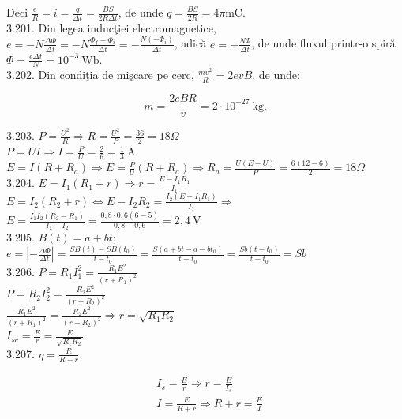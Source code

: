 \documentclass[10pt]{article}
\begin{document}
Deci $\frac{e}{R}=i=\frac{q}{\Delta t}=\frac{B S}{2 R \Delta t}$, de unde $q=\frac{B S}{2 R}=4 \pi \mathrm{mC}$.\\
3.201. Din legea inducţiei electromagnetice,\\
$e=-N \frac{\Delta \Phi}{\Delta t}=-N \frac{\Phi_{f}-\Phi_{i}}{\Delta t}=-\frac{N\left(-\Phi_{i}\right)}{\Delta t}$, adică $e=-\frac{N \Phi}{\Delta t}$, de unde fluxul printr-o spiră $\Phi=\frac{e \Delta t}{N}=10^{-3} \mathrm{~Wb}$.\\
3.202. Din condiţia de mişcare pe cerc, $\frac{m v^{2}}{R}=2 e v B$, de unde:

$$
m=\frac{2 e B R}{v}=2 \cdot 10^{-27} \mathrm{~kg} .
$$

3.203. $P=\frac{U^{2}}{R} \Rightarrow R=\frac{U^{2}}{P}=\frac{36}{2}=18 \Omega$\\
$P=U I \Rightarrow I=\frac{P}{U}=\frac{2}{6}=\frac{1}{3} \mathrm{~A}$\\
$E=I\left(R+R_{a}\right) \Rightarrow E=\frac{P}{U}\left(R+R_{a}\right) \Rightarrow R_{a}=\frac{U(E-U)}{P}=\frac{6(12-6)}{2}=18 \Omega$\\
3.204. $E=I_{1}\left(R_{1}+r\right) \Rightarrow r=\frac{E-I_{1} R_{1}}{I_{1}}$\\
$E=I_{2}\left(R_{2}+r\right) \Leftrightarrow E-I_{2} R_{2}=\frac{I_{2}\left(E-I_{1} R_{1}\right)}{I_{1}} \Rightarrow$\\
$E=\frac{I_{1} I_{2}\left(R_{2}-R_{1}\right)}{I_{1}-I_{2}}=\frac{0,8 \cdot 0,6(6-5)}{0,8-0,6}=2,4 \mathrm{~V}$\\
3.205. $B(t)=a+b t$;\\
$e=\left|-\frac{\Delta \Phi}{\Delta t}\right|=\frac{S B(t)-S B\left(t_{0}\right)}{t-t_{0}}=\frac{S\left(a+b t-a-b t_{0}\right)}{t-t_{0}}=\frac{S b\left(t-t_{0}\right)}{t-t_{0}}=S b$\\
3.206. $P=R_{1} I_{1}^{2}=\frac{R_{1} E^{2}}{\left(r+R_{1}\right)^{2}}$\\
$P=R_{2} I_{2}^{2}=\frac{R_{2} E^{2}}{\left(r+R_{2}\right)^{2}}$\\
$\frac{R_{1} E^{2}}{\left(r+R_{1}\right)^{2}}=\frac{R_{2} E^{2}}{\left(r+R_{2}\right)^{2}} \Rightarrow r=\sqrt{R_{1} R_{2}}$\\
$I_{s c}=\frac{E}{r}=\frac{E}{\sqrt{R_{1} R_{2}}}$\\
3.207. $\eta=\frac{R}{R+r}$

$$
\begin{aligned}
& I_{s}=\frac{E}{r} \Rightarrow r=\frac{E}{I_{s}} \\
& I=\frac{E}{R+r} \Rightarrow R+r=\frac{E}{I}
\end{aligned}
$$
\end{document}
